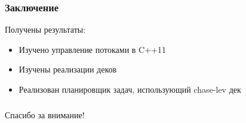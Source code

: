\documentclass[hyperref={unicode}]{beamer}
\begin{document}
\begin{frame}
    \frametitle{Заключение}
    Получены результаты:

	\begin{itemize}
		\item Изучено управление потоками в C++11
        \item Изучены реализации деков
		\item Реализован планировщик задач, использующий chase-lev дек
	\end{itemize}
\end{frame}

\begin{frame}
    \frametitle{}

    {\Large\mbox{}\hfil Спасибо за внимание!}

\end{frame}
\end{document}
